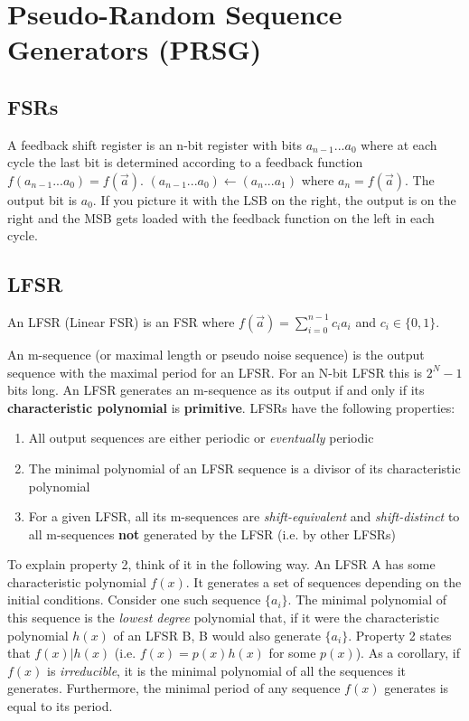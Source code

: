\documentclass[11pt]{report}
\begin{document}
\section{Pseudo-Random Sequence Generators (PRSG)}\label{sec:PRSG}
\subsection{FSRs}
A feedback shift register is an n-bit register with bits $a_{n-1}...a_0$ where at each cycle the last bit is determined according to a feedback function $f(a_{n-1} ... a_0) = f(\vec{a})$. $(a_{n-1} ... a_0) \xleftarrow{} (a_n ... a_1)$ where $a_n = f(\vec{a})$. The output bit is $a_0$. If you picture it with the LSB on the right, the output is on the right and the MSB gets loaded with the feedback function on the left in each cycle.

\subsection{LFSR}\label{sec:LFSR}
An LFSR (Linear FSR) is an FSR where $f(\vec{a}) = \sum_{i = 0}^{n-1} c_ia_i$ and $c_i \in \{0, 1\}$.

An m-sequence (or maximal length or pseudo noise sequence) is the output sequence with the maximal period for an LFSR. For an N-bit LFSR this is $2^N-1$ bits long. An LFSR generates an m-sequence as its output if and only if its \textbf{characteristic polynomial} is \textbf{primitive}. LFSRs have the following properties:

\begin{enumerate}
	\item All output sequences are either periodic or \textit{eventually} periodic
	\item The minimal polynomial of an LFSR sequence is a divisor of its characteristic polynomial
	\item For a given LFSR, all its m-sequences are \textit{shift-equivalent} and \textit{shift-distinct} to all m-sequences \textbf{not} generated by the LFSR (i.e. by other LFSRs)
\end{enumerate}

To explain property 2, think of it in the following way. An LFSR A has some characteristic polynomial $f(x)$. It generates a set of sequences depending on the initial conditions. Consider one such sequence $\{a_i\}$. The minimal polynomial of this sequence is the \textit{lowest degree} polynomial that, if it were the characteristic polynomial $h(x)$ of an LFSR B, B would also generate $\{a_i\}$. Property 2 states that $f(x) | h(x)$ (i.e. $f(x) = p(x)h(x)$ for some $p(x)$). As a corollary, if $f(x)$ is \textit{irreducible}, it is the minimal polynomial of all the sequences it generates. Furthermore, the minimal period of any sequence $f(x)$ generates is equal to its period.
\end{document}
